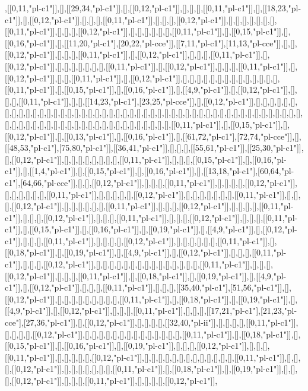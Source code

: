 ,[[0,11,"pl-c1"]],[],[[29,34,"pl-c1"]],[],[[0,12,"pl-c1"]],[],[],[],[[0,11,"pl-c1"]],[],[[18,23,"pl-c1"]],[],[[0,12,"pl-c1"]],[],[],[],[[0,11,"pl-c1"]],[],[],[],[[0,12,"pl-c1"]],[],[],[],[],[],[],[],[[0,11,"pl-c1"]],[],[],[],[[0,12,"pl-c1"]],[],[],[],[],[],[],[[0,11,"pl-c1"]],[],[[0,15,"pl-c1"]],[],[[0,16,"pl-c1"]],[],[[11,20,"pl-c1"],[20,22,"pl-cce"]],[[7,11,"pl-c1"],[11,13,"pl-cce"]],[],[],[[0,12,"pl-c1"]],[],[],[],[[0,11,"pl-c1"]],[],[[0,12,"pl-c1"]],[],[],[],[[0,11,"pl-c1"]],[],[[0,12,"pl-c1"]],[],[],[],[],[],[],[],[[0,11,"pl-c1"]],[],[[0,12,"pl-c1"]],[],[],[],[[0,11,"pl-c1"]],[],[[0,12,"pl-c1"]],[],[],[[0,11,"pl-c1"]],[],[[0,12,"pl-c1"]],[],[],[],[],[],[],[],[],[],[],[],[],[],[],[[0,11,"pl-c1"]],[],[[0,15,"pl-c1"]],[],[[0,16,"pl-c1"]],[],[[4,9,"pl-c1"]],[],[[0,12,"pl-c1"]],[],[],[],[[0,11,"pl-c1"]],[],[],[[14,23,"pl-c1"],[23,25,"pl-cce"]],[],[[0,12,"pl-c1"]],[],[],[],[],[],[],[],[],[],[],[],[],[],[],[],[],[],[],[],[],[],[],[],[],[],[],[],[],[],[],[],[],[],[],[],[],[],[],[],[],[],[],[],[],[],[],[],[],[],[],[],[],[],[],[],[],[],[],[],[],[],[],[],[],[],[],[],[],[],[],[],[],[],[[0,11,"pl-c1"]],[],[[0,15,"pl-c1"]],[],[[0,12,"pl-c1"]],[],[[0,13,"pl-c1"]],[],[[0,16,"pl-c1"]],[],[[61,72,"pl-c1"],[72,74,"pl-cce"]],[],[[48,53,"pl-c1"],[75,80,"pl-c1"]],[[36,41,"pl-c1"]],[],[],[],[[55,61,"pl-c1"]],[[25,30,"pl-c1"]],[],[[0,12,"pl-c1"]],[],[],[],[],[],[],[],[],[[0,11,"pl-c1"]],[],[],[],[[0,15,"pl-c1"]],[],[[0,16,"pl-c1"]],[],[[1,4,"pl-c1"]],[],[[0,15,"pl-c1"]],[],[[0,16,"pl-c1"]],[],[[13,18,"pl-c1"],[60,64,"pl-c1"],[64,66,"pl-cce"]],[],[],[[0,12,"pl-c1"]],[],[],[],[[0,11,"pl-c1"]],[],[],[],[],[[0,12,"pl-c1"]],[],[],[],[],[],[],[[0,11,"pl-c1"]],[],[],[],[],[],[[0,12,"pl-c1"]],[],[],[],[],[],[],[],[[0,11,"pl-c1"]],[],[],[],[[0,12,"pl-c1"]],[],[],[],[],[],[],[[0,11,"pl-c1"]],[],[],[],[[0,12,"pl-c1"]],[],[],[],[],[[0,11,"pl-c1"]],[],[],[],[[0,12,"pl-c1"]],[],[],[],[[0,11,"pl-c1"]],[],[],[],[[0,12,"pl-c1"]],[],[],[],[[0,11,"pl-c1"]],[],[[0,15,"pl-c1"]],[],[[0,16,"pl-c1"]],[],[[0,19,"pl-c1"]],[],[[4,9,"pl-c1"]],[],[[0,12,"pl-c1"]],[],[],[],[[0,11,"pl-c1"]],[],[],[],[],[[0,12,"pl-c1"]],[],[],[],[],[],[],[[0,11,"pl-c1"]],[],[[0,18,"pl-c1"]],[],[[0,19,"pl-c1"]],[],[[4,9,"pl-c1"]],[],[[0,12,"pl-c1"]],[],[],[],[[0,11,"pl-c1"]],[],[],[],[[0,12,"pl-c1"]],[],[],[],[],[],[],[],[],[],[],[],[],[],[],[],[[0,11,"pl-c1"]],[],[],[],[[0,12,"pl-c1"]],[],[],[],[[0,11,"pl-c1"]],[],[[0,18,"pl-c1"]],[],[[0,19,"pl-c1"]],[],[[4,9,"pl-c1"]],[],[[0,12,"pl-c1"]],[],[],[],[[0,11,"pl-c1"]],[],[],[],[[35,40,"pl-c1"],[51,56,"pl-c1"]],[],[[0,12,"pl-c1"]],[],[],[],[],[],[],[],[],[],[[0,11,"pl-c1"]],[],[[0,18,"pl-c1"]],[],[[0,19,"pl-c1"]],[],[[4,9,"pl-c1"]],[],[[0,12,"pl-c1"]],[],[],[],[[0,11,"pl-c1"]],[],[],[],[[17,21,"pl-c1"],[21,23,"pl-cce"],[27,36,"pl-c1"]],[],[[0,12,"pl-c1"]],[],[],[],[],[[32,40,"pl-ii"]],[],[],[],[],[[0,11,"pl-c1"]],[],[],[],[],[[0,12,"pl-c1"]],[],[],[],[],[],[],[],[],[],[],[],[],[],[],[[0,11,"pl-c1"]],[],[[0,18,"pl-c1"]],[],[[0,15,"pl-c1"]],[],[[0,16,"pl-c1"]],[],[[0,19,"pl-c1"]],[],[],[],[[0,12,"pl-c1"]],[],[],[],[[0,11,"pl-c1"]],[],[],[],[],[],[[0,12,"pl-c1"]],[],[],[],[],[],[],[],[],[],[],[],[],[],[[0,11,"pl-c1"]],[],[],[],[[0,12,"pl-c1"]],[],[],[],[],[],[],[],[[0,11,"pl-c1"]],[],[[0,18,"pl-c1"]],[],[[0,19,"pl-c1"]],[],[],[],[[0,12,"pl-c1"]],[],[],[],[[0,11,"pl-c1"]],[],[],[],[],[[0,12,"pl-c1"]],